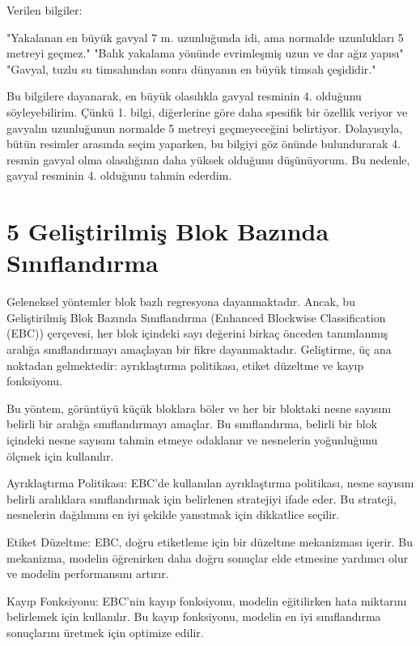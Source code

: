 \documentclass[10pt,a4paper]{report}
\begin{document}
	Verilen bilgiler:
	
	"Yakalanan en büyük gavyal 7 m. uzunluğunda idi, ama normalde uzunlukları 5 metreyi geçmez."
	"Balık yakalama yönünde evrimleşmiş uzun ve dar ağız yapısı"
	"Gavyal, tuzlu su timsahından sonra dünyanın en büyük timsah çeşididir."
	
	Bu bilgilere dayanarak, en büyük olasılıkla gavyal resminin 4. olduğunu söyleyebilirim. Çünkü 1. bilgi, diğerlerine göre daha spesifik bir özellik veriyor ve gavyalın uzunluğunun normalde 5 metreyi geçmeyeceğini belirtiyor. Dolayısıyla, bütün  resimler arasında seçim yaparken, bu bilgiyi göz önünde bulundurarak 4. resmin gavyal olma olasılığının daha yüksek olduğunu düşünüyorum. Bu nedenle, gavyal resminin 4. olduğunu tahmin ederdim.
	
	\clearpage
	
	\section* {5 Geliştirilmiş Blok Bazında Sınıflandırma}
	Geleneksel yöntemler blok bazlı regresyona dayanmaktadır. Ancak, bu Geliştirilmiş Blok Bazında Sınıflandırma (Enhanced Blockwise Classification (EBC)) çerçevesi, her blok içindeki sayı değerini birkaç önceden tanımlanmış aralığa sınıflandırmayı amaçlayan bir fikre dayanmaktadır. Geliştirme, üç ana noktadan gelmektedir: ayrıklaştırma politikası, etiket düzeltme ve kayıp fonksiyonu\cite{idrees2018composition}.
	\newline  
	
	
	 Bu yöntem, görüntüyü küçük bloklara böler ve her bir bloktaki nesne sayısını belirli bir aralığa sınıflandırmayı amaçlar. Bu sınıflandırma, belirli bir blok içindeki nesne sayısını tahmin etmeye odaklanır ve nesnelerin yoğunluğunu ölçmek için kullanılır.
	 \newline   
	 
	 
	  Ayrıklaştırma Politikası: EBC'de kullanılan ayrıklaştırma politikası, nesne sayısını belirli aralıklara sınıflandırmak için belirlenen stratejiyi ifade eder. Bu strateji, nesnelerin dağılımını en iyi şekilde yansıtmak için dikkatlice seçilir.
	 
	 Etiket Düzeltme: EBC, doğru etiketleme için bir düzeltme mekanizması içerir. Bu mekanizma, modelin öğrenirken daha doğru sonuçlar elde etmesine yardımcı olur ve modelin performansını artırır.
	 
	 Kayıp Fonksiyonu: EBC'nin kayıp fonksiyonu, modelin eğitilirken hata miktarını belirlemek için kullanılır. Bu kayıp fonksiyonu, modelin en iyi sınıflandırma sonuçlarını üretmek için optimize edilir.
	 
\end{document}
